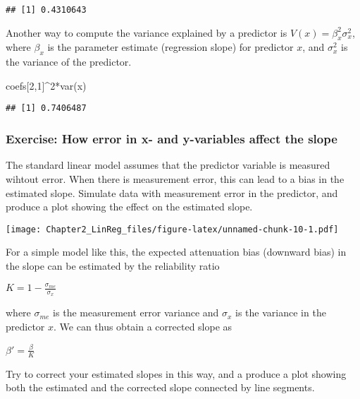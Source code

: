\documentclass[
]{article}
\newenvironment{Shaded}{\begin{snugshade}}{\end{snugshade}}
\newcommand{\DecValTok}[1]{\textcolor[rgb]{0.00,0.00,0.81}{#1}}
\newcommand{\FunctionTok}[1]{\textcolor[rgb]{0.00,0.00,0.00}{#1}}
\newcommand{\NormalTok}[1]{#1}
\newcommand{\SpecialCharTok}[1]{\textcolor[rgb]{0.00,0.00,0.00}{#1}}
\begin{document}
\begin{verbatim}
## [1] 0.4310643
\end{verbatim}

Another way to compute the variance explained by a predictor is
\(V(x) = \beta_x^2\sigma_x^2\), where \(\beta_x\) is the parameter
estimate (regression slope) for predictor \(x\), and \(\sigma_x^2\) is
the variance of the predictor.

\begin{Shaded}
\begin{Highlighting}[]
\NormalTok{coefs[}\DecValTok{2}\NormalTok{,}\DecValTok{1}\NormalTok{]}\SpecialCharTok{\^{}}\DecValTok{2}\SpecialCharTok{*}\FunctionTok{var}\NormalTok{(x)}
\end{Highlighting}
\end{Shaded}

\begin{verbatim}
## [1] 0.7406487
\end{verbatim}

\hypertarget{exercise-how-error-in-x--and-y-variables-affect-the-slope}{%
\subsubsection{Exercise: How error in x- and y-variables affect the
slope}\label{exercise-how-error-in-x--and-y-variables-affect-the-slope}}

The standard linear model assumes that the predictor variable is
measured wihtout error. When there is measurement error, this can lead
to a bias in the estimated slope. Simulate data with measurement error
in the predictor, and produce a plot showing the effect on the estimated
slope.

\texttt{[image: Chapter2\_LinReg\_files/figure-latex/unnamed-chunk-10-1.pdf]}

For a simple model like this, the expected attenuation bias (downward
bias) in the slope can be estimated by the reliability ratio

\(K = 1-\frac{\sigma_{me}}{\sigma_x}\)

where \(\sigma_{me}\) is the measurement error variance and \(\sigma_x\)
is the variance in the predictor \(x\). We can thus obtain a corrected
slope as

\(\beta'=\frac{\beta}{K}\)

Try to correct your estimated slopes in this way, and a produce a plot
showing both the estimated and the corrected slope connected by line
segments.
\end{document}
